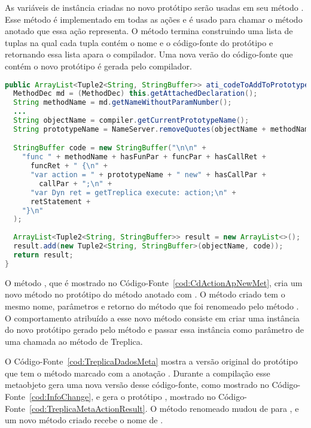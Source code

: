 As variáveis de instância criadas no novo protótipo serão usadas em seu método . Esse método é implementado em todas as ações e é usado para chamar o método anotado que essa ação representa. O método  termina construindo uma lista de tuplas na qual cada tupla contém o nome e o código-fonte do protótipo e retornando essa lista apara o compilador. Uma nova verão do código-fonte que contém o novo protótipo é gerada pelo compilador.

\begin{lstlisting}[language=Java, caption={Método que adiciona o novo método do contexto}, label={cod:CdActionApNewMet}, frame=TLBR, basicstyle=\linespread{0.8}\fontsize{9}{\baselineskip}\selectfont\ttfamily]
public ArrayList<Tuple2<String, StringBuffer>> ati_codeToAddToPrototypes(ICompiler_ati compiler) {
  MethodDec md = (MethodDec) this.getAttachedDeclaration();
  String methodName = md.getNameWithoutParamNumber();
  ...
  String objectName = compiler.getCurrentPrototypeName();
  String prototypeName = NameServer.removeQuotes(objectName + methodName);

  StringBuffer code = new StringBuffer("\n\n" + 
    "func " + methodName + hasFunPar + funcPar + hasCallRet + 
      funcRet + " {\n" + 
      "var action = " + prototypeName + " new" + hasCallPar + 
        callPar + ";\n" + 
      "var Dyn ret = getTreplica execute: action;\n" + 
      retStatement + 
    "}\n"
  );
    
  ArrayList<Tuple2<String, StringBuffer>> result = new ArrayList<>();
  result.add(new Tuple2<String, StringBuffer>(objectName, code));
  return result;
}
\end{lstlisting}

O método , que é mostrado no Código-Fonte~\ref{cod:CdActionApNewMet}, cria um novo método no protótipo do método anotado com . O método criado tem o mesmo nome, parâmetros e retorno do método que foi renomeado pelo método . O comportamento atribuído a esse novo método consiste em criar uma instância do novo protótipo gerado pelo método   e passar essa instância como parâmetro de uma chamada ao método  de Treplica.

O Código-Fonte~\ref{cod:TreplicaDadosMeta} mostra a versão original do protótipo  que tem o método  marcado com a anotação . Durante a compilação esse metaobjeto gera uma nova versão desse código-fonte, como mostrado no Código-Fonte~\ref{cod:InfoChange}, e gera o protótipo , mostrado no Código-Fonte~\ref{cod:TreplicaMetaActionResult}. O método renomeado mudou de  para , e um novo método criado recebe o nome de .

